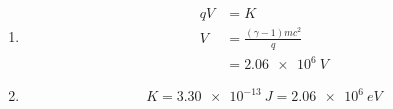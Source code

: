 \documentclass{article}
\begin{document}
\setcounter{subsubsection}{40}
\subsubsection{}

\begin{enumerate}
  \item

        \begin{align*}
          q V & = K                            \\
          V   & = \frac{(\gamma - 1) m c^2}{q} \\
              & = \qty{2.06e6}{V}
        \end{align*}

  \item \[K = \qty{3.30e-13}{J} = \qty{2.06e6}{eV}\]
\end{enumerate}

\setcounter{subsubsection}{42}
\subsubsection{}
\end{document}
